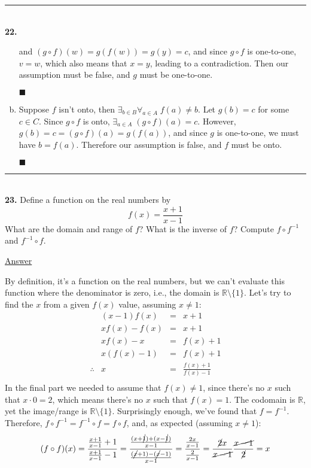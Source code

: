 \documentclass{article}[10pt]
\newenvironment{exercise}[1]
    {\noindent\rule{2cm}{0.4pt} \\
     \textbf{#1.}}
    {}
\newcommand{\answer}{

  \underline{Answer}

}
\newcommand{\qed}{

\hfill\ensuremath{\blacksquare}

}
\begin{document}
\begin{exercise}{22}
\begin{enumerate}[(a)]
      and $(g \circ f)(w) = g(f(w)) = g(y) = c$,
      and since $g \circ f$ is one-to-one, $v = w$,
      which also means that $x = y$, leading to a contradiction.
      Then our assumption must be false, and $g$ must be one-to-one.
      \qed
    \item
      Suppose $f$ isn't onto,
      then $\exists_{b \in B} \forall_{a \in A} \; f(a) \ne b$.
      Let $g(b) = c$ for some $c \in C$.
      Since $g \circ f$ is onto,
      $\exists_{a \in A} \; (g \circ f)(a) = c$.
      However, $g(b) = c = (g \circ f)(a) = g(f(a))$,
      and since $g$ is one-to-one, we must have $b = f(a)$.
      Therefore our assumption is false, and $f$ must be onto.
      \qed
  \end{enumerate}
\end{exercise}


\begin{exercise}{23}
  Define a function on the real numbers by
  \[f(x) = \frac{x+1}{x-1}\]
  What are the domain and range of $f$?
  What is the inverse of $f$?
  Compute $f \circ f^{-1}$ and $f^{-1} \circ f$.
  \answer
  By definition, it's a function on the real numbers,
  but we can't evaluate this function where the denominator is zero,
  i.e., the domain is $\mathds{R} \setminus \{1\}$.
  Let's try to find the $x$ from a given $f(x)$ value,
  assuming $x \ne 1$:
  \[\begin{array}{rrcl}
               & (x - 1) f(x) &=& x + 1 \\
               & x f(x) - f(x) &=& x + 1 \\
               & x f(x) - x &=& f(x) + 1 \\
               & x (f(x) - 1) &=& f(x) + 1 \\
    \therefore & x &=& \frac{f(x) + 1}{f(x) - 1} \\
  \end{array}\]
  In the final part we needed to assume that $f(x) \ne 1$,
  since there's no $x$ such that $x \cdot 0 = 2$,
  which means there's no $x$ such that $f(x) = 1$.
  The codomain is $\mathds{R}$,
  yet the image/range is $\mathds{R} \setminus \{1\}$.
  Surprisingly enough, we've found that $f = f^{-1}$.
  Therefore, $f \circ f^{-1} = f^{-1} \circ f = f \circ f$,
  and, as expected (assuming $x \ne 1$):
  \[
    (f \circ f)(x)
    = \frac{\frac{x+1}{x-1}+1}{\frac{x+1}{x-1}-1}
    = \frac{\frac{(x+\cancel{1})+(x-\cancel{1})}{x-1}}
           {\frac{(\cancel{x}+1)-(\cancel{x}-1)}{x-1}}
    = \frac{\frac{2 x}{x-1}}{\frac{2}{x-1}}
    = \frac{\cancel{2} x}{\cancel{x-1}}
      \frac{\cancel{x-1}}{\cancel{2}}
    = x
  \]
\end{exercise}
\end{document}
